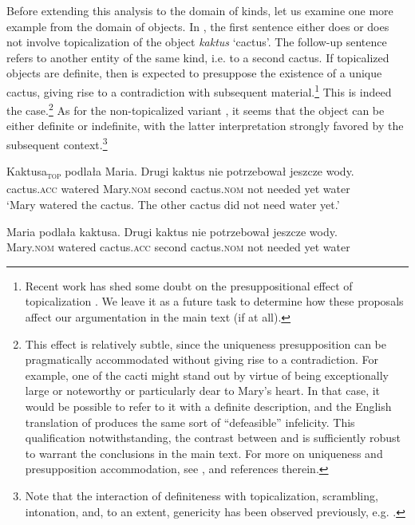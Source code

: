 \documentclass[output=paper]{langscibook}
\begin{document}
\noindent Before extending this analysis to the domain of kinds, let us examine one more example from the domain of objects. In , the first sentence either does  or does not  involve topicalization of the object \textit{kaktus} `cactus'. The follow-up sentence refers to another entity of the same kind, i.e. to a second cactus. If topicalized objects are definite, then  is expected to presuppose the existence of a unique cactus, giving rise to a contradiction with subsequent material.\footnote{Recent work has shed some doubt on the presuppositional effect of topicalization \citep{Seres.Borik2021, Simik.Demian2020}. We leave it as a future task to determine how these proposals affect our argumentation in the main text (if at all).} This is indeed the case.\footnote{This effect is relatively subtle, since the uniqueness presupposition can be pragmatically accommodated without giving rise to a contradiction. For example, one of the cacti might stand out by virtue of being exceptionally large or noteworthy or particularly dear to Mary's heart. In that case, it would be possible to refer to it with a definite description, and the English translation of  produces the same sort of ``defeasible'' infelicity. This qualification notwithstanding, the contrast between  and  is sufficiently robust to warrant the conclusions in the main text. For more on uniqueness and presupposition accommodation, see \citet{Frazier2006}, \citet{VonFintel2008} and references therein.} As for the non-topicalized variant , it seems that the object can be either definite or indefinite, with the latter interpretation strongly favored by the subsequent context.\footnote{Note that the interaction of definiteness with topicalization, scrambling, intonation, and, to an extent, genericity has been observed previously, e.g. \citet{Szwedek1974}.}

\ea \label{ex:cactus}
\ea \gll
Kaktusa\textsubscript{\textsc{top}} podlała Maria. \minsp{\#} Drugi kaktus nie potrzebował jeszcze wody.\\
cactus.\textsc{acc} watered Mary.\textsc{nom} {} second cactus.\textsc{nom} not needed yet water\\

\glt `Mary watered the cactus. The other cactus did not need water yet.' \label{ex:cactus_1}

\ex \gll
Maria podlała kaktusa. Drugi kaktus nie potrzebował jeszcze wody.\\
Mary.\textsc{nom} watered cactus.\textsc{acc} second cactus.\textsc{nom} not needed yet water\\
\end{document}
